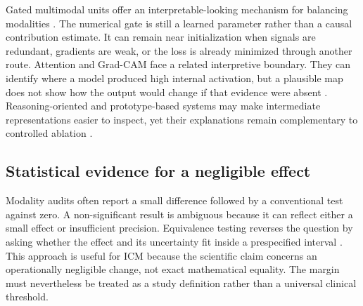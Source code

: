 \documentclass[10pt,a4paper,twocolumn]{article}
\begin{document}
Gated multimodal units offer an interpretable-looking mechanism for balancing
modalities \cite{arevalo2017gmu}. The numerical gate is still a learned
parameter rather than a causal contribution estimate. It can remain near
initialization when signals are redundant, gradients are weak, or the loss is
already minimized through another route. Attention and Grad-CAM face a related
interpretive boundary. They can identify where a model produced high internal
activation, but a plausible map does not show how the output would change if
that evidence were absent \cite{selvaraju2017gradcam}. Reasoning-oriented and
prototype-based systems may make intermediate representations easier to
inspect, yet their explanations remain complementary to controlled ablation
\cite{myronenko2025reasoningcxr,chiang2026cxrnexus}.

\subsection{Statistical evidence for a negligible effect}

Modality audits often report a small difference followed by a conventional
test against zero. A non-significant result is ambiguous because it can reflect
either a small effect or insufficient precision. Equivalence testing reverses
the question by asking whether the effect and its uncertainty fit inside a
prespecified interval \cite{lakens2017equivalence}. This approach is useful for
ICM because the scientific claim concerns an operationally negligible change,
not exact mathematical equality. The margin must nevertheless be treated as a
study definition rather than a universal clinical threshold.
\end{document}
